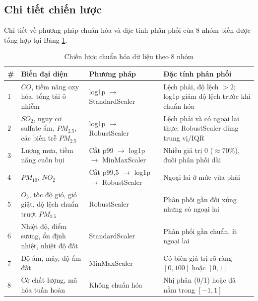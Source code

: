 \subsection{Chi tiết chiến lược}

Chi tiết về phương pháp chuẩn hóa và đặc tính phân phối của 8 nhóm biến được tổng hợp tại Bảng \ref{tab:chien_luoc_chuan_hoa}.

\begin{table}[H]
    \centering
    \caption{Chiến lược chuẩn hóa dữ liệu theo 8 nhóm}
    \label{tab:chien_luoc_chuan_hoa}
    \renewcommand{\arraystretch}{1.3}
    \begin{tabular}{p{0.8cm} p{3.5cm} p{4.2cm} p{5cm}}
    \toprule
    \textbf{\#} & \textbf{Biến đại diện} & \textbf{Phương pháp} & \textbf{Đặc tính phân phối} \\
    \midrule
    1 & $CO$, tiềm năng oxy hóa, tổng tải ô nhiễm & log1p \cite{box1964analysis} $\rightarrow$ StandardScaler \cite{lecun1998efficient} & Lệch phải, độ lệch $> 2$; log1p giảm độ lệch trước khi chuẩn hóa \\
    2 & $SO_2$, nguy cơ sulfate ẩm, $PM_{2.5}$, các biến trễ $PM_{2.5}$ & log1p \cite{box1964analysis} $\rightarrow$ RobustScaler \cite{rousseeuw1993robust, tukey1977exploratory} & Lệch phải và có ngoại lai thực; RobustScaler dùng trung vị/IQR \\
    3 & Lượng mưa, tiềm năng cuốn bụi & Cắt p99 \cite{hastings1947low} $\rightarrow$ log1p \cite{box1964analysis} $\rightarrow$ MinMaxScaler \cite{han2011data} & Nhiều giá trị 0 ($\approx 70\%$), đuôi phân phối dài \\
    4 & $PM_{10}$, $NO_2$ & Cắt p99,5 \cite{hastings1947low} $\rightarrow$ log1p \cite{box1964analysis} $\rightarrow$ RobustScaler \cite{tukey1977exploratory} & Ngoại lai ở mức vừa phải \\
    5 & $O_3$, tốc độ gió, gió giật, độ lệch chuẩn trượt $PM_{2.5}$ & RobustScaler \cite{tukey1977exploratory} & Phân phối gần đối xứng nhưng có ngoại lai \\
    6 & Nhiệt độ, điểm sương, ổn định nhiệt, nhiệt độ đất & StandardScaler \cite{lecun1998efficient} & Phân phối gần chuẩn, ít ngoại lai \\
    7 & Độ ẩm, mây, độ ẩm đất & MinMaxScaler \cite{han2011data} & Có biên giá trị rõ ràng $[0, 100]$ hoặc $[0, 1]$ \\
    8 & Cờ chất lượng, mã hóa tuần hoàn & Không chuẩn hóa & Nhị phân (0/1) hoặc đã nằm trong $[-1, 1]$ \\
    \bottomrule
    \end{tabular}
\end{table}


